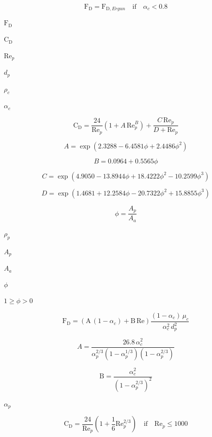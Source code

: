 \documentclass{article}
\begin{document}
\[
    \mathrm{F}_\mathrm{D} = \mathrm{F}_{\mathrm{D}, Ergun}
        \quad \mathrm{if} \quad \alpha_c < 0.8
\]
\pagebreak

$        \mathrm{F}_\mathrm{D} $
\pagebreak

$        \mathrm{C}_\mathrm{D} $
\pagebreak

$        \mathrm{Re}_p         $
\pagebreak

$        d_p                   $
\pagebreak

$        \rho_c   $
\pagebreak

$        \alpha_c              $
\pagebreak

\[
    \mathrm{C}_\mathrm{D} =
        \frac{24}{\mathrm{Re}_p} \left( 1 + A \, \mathrm{Re}_p^B \right)
      + \frac{C \, \mathrm{Re}_p}{D + \mathrm{Re}_p}
\]
\pagebreak

\[
    A = \exp(2.3288 - 6.4581\phi + 2.4486 \phi^2)
\]
\pagebreak

\[
    B = 0.0964 + 0.5565\phi
\]
\pagebreak

\[
    C = \exp(4.9050 - 13.8944\phi + 18.4222\phi^2 - 10.2599 \phi^3)
\]
\pagebreak

\[
    D = \exp(1.4681 + 12.2584\phi - 20.7322\phi^2 + 15.8855\phi^3)
\]
\pagebreak

\[
    \phi = \frac{A_p}{A_a}
\]
\pagebreak

$        \rho_p                $
\pagebreak

$        A_p        $
\pagebreak

$        A_a           $
\pagebreak

$        \phi          $
\pagebreak

$ 1 \geq \phi > 0 $
\pagebreak

\[
    \mathrm{F}_\mathrm{D} =
        \left(\mathrm{A}\, (1-\alpha_c) + \mathrm{B}\, \mathrm{Re}\right)
        \frac{(1-\alpha_c)\, \mu_c}{\alpha_c^2\, d_p^2}
\]
\pagebreak

\[
    A = \frac{26.8\, \alpha_c^2}
    {
        \alpha_p^{2/3}
        (1 - \alpha_p^{1/3})
        (1 - \alpha_p^{2/3})
    }
\]
\pagebreak

\[
    \mathrm{B} = \frac{\alpha_c^2}{\left( 1 - \alpha_p^{2/3} \right)^2}
\]
\pagebreak

$        \alpha_p              $
\pagebreak

\[
    \mathrm{C}_\mathrm{D} =
        \frac{24}{\mathrm{Re}_p}
        \left(1 + \frac{1}{6}\mathrm{Re}_p^{2/3} \right)
        \quad \mathrm{if} \quad \mathrm{Re}_p \leq 1000
\]
\pagebreak
\end{document}
